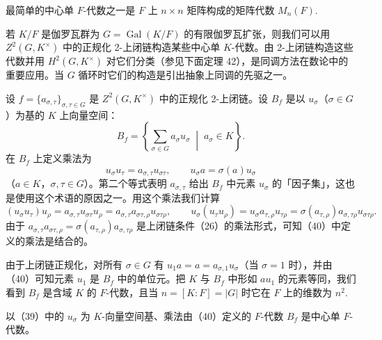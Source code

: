 最简单的中心单 \(F\)-代数之一是 \(F\) 上 \(n \times n\) 矩阵构成的矩阵代数 \(M_n(F)\).

若 \(K/F\) 是伽罗瓦群为 \(G = \operatorname{Gal}(K/F)\) 的有限伽罗瓦扩张，则我们可以用 \(Z^2(G, K^\times)\) 中的正规化 2-上闭链构造某些中心单 \(K\)-代数。由 2-上闭链构造这些代数并用 \(H^2(G, K^\times)\) 对它们分类（参见下面定理 42），是同调方法在数论中的重要应用。当 \(G\) 循环时它们的构造是引出抽象上同调的先驱之一。

设 \(f = \{a_{\sigma,\tau}\}_{\sigma,\tau \in G}\) 是 \(Z^2(G, K^\times)\) 中的正规化 2-上闭链。设 \(B_f\) 是以 \(u_\sigma\)（\(\sigma \in G\)）为基的 \(K\) 上向量空间：
\[
B_f = \left\{\sum_{\sigma \in G}a_\sigma u_\sigma \;\middle|\; a_\sigma \in K\right\}. \tag{17.39}
\]
在 \(B_f\) 上定义乘法为
\[
u_\sigma u_\tau = a_{\sigma,\tau}u_{\sigma\tau}, \qquad u_\sigma a = \sigma(a)u_\sigma \tag{17.40}
\]
（\(a \in K\)，\(\sigma, \tau \in G\)）。第二个等式表明 \(a_{\sigma,\tau}\) 给出 \(B_f\) 中元素 \(u_\sigma\) 的「因子集」，这也是使用这个术语的原因之一。用这个乘法我们计算
\[
(u_\sigma u_\tau)u_\rho = a_{\sigma,\tau}u_{\sigma\tau}u_\rho = a_{\sigma,\tau}a_{\sigma\tau,\rho}u_{\sigma\tau\rho}, \qquad u_\sigma(u_\tau u_\rho) = u_\sigma a_{\tau,\rho}u_{\tau\rho} = \sigma(a_{\tau,\rho})a_{\sigma,\tau\rho}u_{\sigma\tau\rho}.
\]
由于 \(a_{\sigma,\tau}a_{\sigma\tau,\rho} = \sigma(a_{\tau,\rho})a_{\sigma,\tau\rho}\) 是上闭链条件（26）的乘法形式，可知（40）中定义的乘法是结合的。

由于上闭链正规化，对所有 \(\sigma \in G\) 有 \(u_1a = a = a_{\sigma,1}u_\sigma\)（当 \(\sigma = 1\) 时），并由（40）可知元素 \(u_1\) 是 \(B_f\) 中的单位元。把 \(K\) 与 \(B_f\) 中形如 \(au_1\) 的元素等同，我们看到 \(B_f\) 是含域 \(K\) 的 \(F\)-代数，且当 \(n = [K:F] = |G|\) 时它在 \(F\) 上的维数为 \(n^2\).

\begin{proposition}\label{pro:17.40}
以（39）中的 \(u_\sigma\) 为 \(K\)-向量空间基、乘法由（40）定义的 \(F\)-代数 \(B_f\) 是中心单 \(F\)-代数。
\end{proposition}

